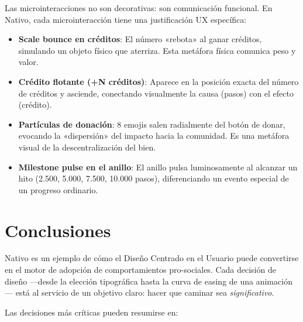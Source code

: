 \documentclass[12pt, a4paper]{article}
\begin{document}
\begin{warningbox}
Las microinteracciones no son decorativas: son comunicación funcional. En Nativo, cada microinteracción tiene una justificación UX específica:

\begin{itemize}
  \item \textbf{Scale bounce en créditos}: El número «rebota» al ganar créditos, simulando un objeto físico que aterriza. Esta metáfora física comunica peso y valor.
  \item \textbf{Crédito flotante (+N créditos)}: Aparece en la posición exacta del número de créditos y asciende, conectando visualmente la causa (pasos) con el efecto (crédito).
  \item \textbf{Partículas de donación}: 8 emojis salen radialmente del botón de donar, evocando la «dispersión» del impacto hacia la comunidad. Es una metáfora visual de la descentralización del bien.
  \item \textbf{Milestone pulse en el anillo}: El anillo pulsa luminosamente al alcanzar un hito (2.500, 5.000, 7.500, 10.000 pasos), diferenciando un evento especial de un progreso ordinario.
\end{itemize}
\end{warningbox}

\newpage
\section{Conclusiones}

Nativo es un ejemplo de cómo el Diseño Centrado en el Usuario puede convertirse en el motor de adopción de comportamientos pro-sociales. Cada decisión de diseño —desde la elección tipográfica hasta la curva de easing de una animación— está al servicio de un objetivo claro: hacer que caminar sea \textit{significativo}.

Las decisiones más críticas pueden resumirse en:
\end{document}
